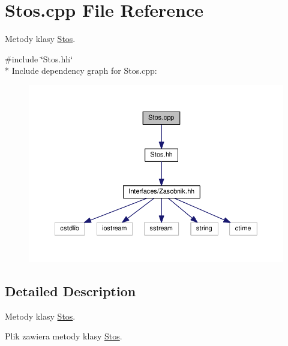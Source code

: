 \hypertarget{a00048}{}\section{Stos.\+cpp File Reference}
\label{a00048}


Metody klasy \hyperlink{a00016}{Stos}.  


{\ttfamily \#include \char`\"{}Stos.\+hh\char`\"{}}\\*
Include dependency graph for Stos.\+cpp\+:
\nopagebreak
\begin{figure}[H]
\begin{center}
\leavevmode
\includegraphics[width=350pt]{a00097}
\end{center}
\end{figure}


\subsection{Detailed Description}
Metody klasy \hyperlink{a00016}{Stos}. 

Plik zawiera metody klasy \hyperlink{a00016}{Stos}. 